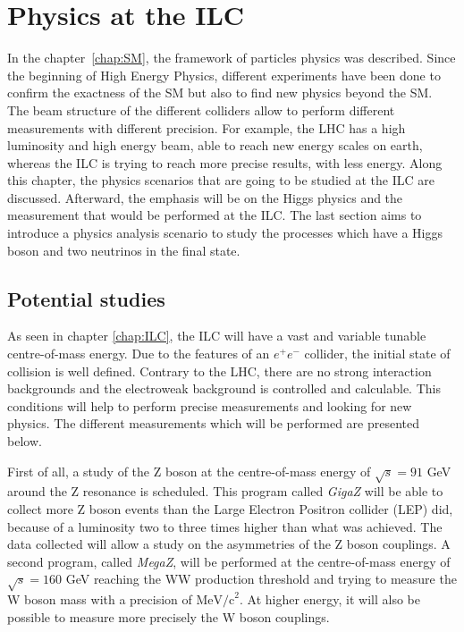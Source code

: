 \chapter{Physics at the ILC}

  In the chapter~\ref{chap:SM}, the framework of particles physics was described. 
  Since the beginning of High Energy Physics, different experiments have been done to confirm the exactness of the SM but also to find new physics beyond the SM. 
  The beam structure of the different colliders allow to perform different measurements with different precision. 
  For example, the LHC has a high luminosity and high energy beam, able to reach new energy scales on earth, whereas the ILC is trying to reach more precise results, with less energy. 
  Along this chapter, the physics scenarios that are going to be studied at the ILC are discussed. 
  Afterward, the emphasis will be on the Higgs physics and the measurement that would be performed at the ILC. 
  The last section aims to introduce a physics analysis scenario to study the processes which have a Higgs boson and two neutrinos in the final state.
 
 \minitoc

  \section{Potential studies}

  As seen in chapter \ref{chap:ILC}, the ILC will have a vast and variable tunable centre-of-mass energy.
  Due to the features of an $e^+e^-$ collider, the initial state of collision is well defined.
  Contrary to the LHC, there are no strong interaction backgrounds and the electroweak background is controlled and calculable.
  This conditions will help to perform precise measurements and looking for new physics. 
  The different measurements which will be performed are presented below.

   First of all, a study of the Z boson at the centre-of-mass energy of $\sqrt{s} = 91$ GeV around the Z resonance is scheduled. 
   This program called \textit{GigaZ} will be able to collect more Z boson events than the Large Electron Positron collider (LEP) did, because of a luminosity two to three times higher than what was achieved. 
   The data collected will allow a study on the asymmetries of the Z boson couplings. 
   A second program, called \textit{MegaZ}, will be performed at the centre-of-mass energy of $\sqrt{s} = 160$ GeV reaching the WW production threshold and trying to measure the W boson mass with a precision of $\text{MeV/c}^2$.
   At higher energy, it will also be possible to measure more precisely the W boson couplings.

